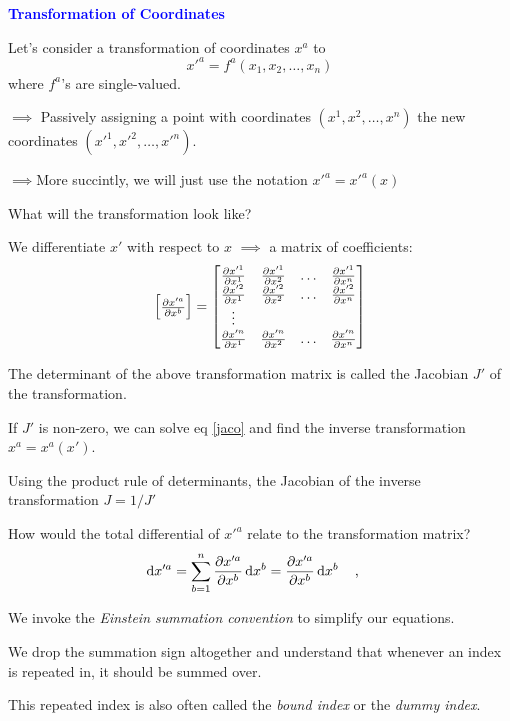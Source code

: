 \documentclass[landscape,aspectratio=169]{slides}
\begin{document}
\begin{slide}
	\textcolor{blue}{\textbf{Transformation of Coordinates}}
	
	Let's consider a transformation of coordinates $ x^a $ to $$ x'^a =  f^a (x_1, x_2,\ldots, x_n) $$ where $ f^a $'s are single-valued.
	
	$ \implies $ Passively assigning a point with coordinates $ (x^1, x^2,\ldots, x^n) $ the new coordinates $ (x'^1,x'^2, \ldots, x'^n) $. 
	
	$ \implies $More succintly, we will just use the notation $ x'^a = x'^a(x) $
	
	What will the transformation look like?

\end{slide}	

\begin{slide}
	We differentiate $ x' $ with respect to $ x $ $ \implies $ a matrix of coefficients:
	\begin{equation}\label{jaco}
	\mqty[\pdv{x'^a}{x^b}] = \mqty[\pdv{x'^1}{x^1} & \pdv{x'^1}{x^2} & \ldots & \pdv{x'^1}{x^n} \\
	\pdv{x'^2}{x^1} & \pdv{x'^2}{x^2} & \ldots & \pdv{x'^2}{x^n} \\
	\vdots & & & \\
	\pdv{x'^n}{x^1} & \pdv{x'^n}{x^2} & \ldots & \pdv{x'^n}{x^n} 
	]
	\end{equation}

The determinant of the above transformation matrix is called the Jacobian $ J' $ of the transformation.

If $ J' $ is non-zero, we can solve eq \ref{jaco} and find the inverse transformation $ x^a = x^a(x') $. 

Using the product rule of determinants, the Jacobian of the inverse transformation $ J = 1/J'$
\end{slide}

\begin{slide}
	How would the total differential of $ x'^a $ relate to the transformation matrix?\begin{equation}\label{difftransform}
	\dd{x'^a} = \sum_{b = 1}^{n} \pdv{x'^a}{x^b} \dd{x^b} = \pdv{x'^a}{x^b} \dd{x^b}  \qq{,}
	\end{equation}
	
	We invoke the \textit{Einstein summation convention} to simplify our equations.
	
	We drop the summation sign altogether and understand that whenever an index is repeated in, it should be summed over.
	
	This repeated index is also often called the \textit{bound index} or the \textit{dummy index}.
	
	
\end{slide}
\end{document}
